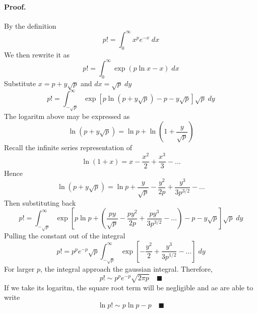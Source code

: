 \documentclass[../../main.tex]{subfiles}
\begin{document}
\paragraph*{Proof.} By the definition
\begin{equation*}
    p!=\int_{0}^{\infty}x^pe^{-x}\;dx
\end{equation*} 
We then rewrite it as 
\begin{equation*}
    p!=\int_{0}^{\infty}\exp\left(p\ln x-x\right)\;dx 
\end{equation*}
Substitute $x=p+y\sqrt{p}$ and $dx=\sqrt{p}\;dy$
\begin{equation*}
    p!=\int_{-\sqrt{p}}^{\infty}\exp\left[p\ln \left(p+y\sqrt{p} \right)-p-y\sqrt{p}\right]\sqrt{p}\;dy 
\end{equation*}
The logaritm above may be expressed as 
\begin{equation*}
    \ln \left(p+y\sqrt{p} \right)=\ln p+\ln \left(1+\frac{y}{\sqrt{p}}\right)
\end{equation*}
Recall the infinite series representation of 
\begin{equation*}
    \ln (1+x)=x-\frac{x^2}{2}+\frac{x^3}{3}-\dots
\end{equation*}
Hence 
\begin{equation*}
    \ln \left(p+y\sqrt{p} \right)=\ln p+\frac{y}{\sqrt{p}}-\frac{y^2}{2p}+\frac{y^3}{3p^{3/2}}-\dots
\end{equation*}
Then substituting back 
\begin{equation*}
    p!=\int_{-\sqrt{p}}^{\infty}\exp\left[p\ln p + \left(\frac{py}{\sqrt{p}}-\frac{py^2}{2p}+\frac{py^3}{3p^{3/2}}-\dots\right)-p-y\sqrt{p}\right]\sqrt{p}\;dy 
\end{equation*}
Pulling the constant out of the integral 
\begin{equation*}
    p!=p^pe^{-p}\sqrt{p}\int_{-\sqrt{p}}^{\infty}\exp\left[-\frac{y^2}{2}+\frac{y^3}{3p^{1/2}}-\dots\right]\;dy 
\end{equation*}
For larger $p$, the integral approach the gaussian integral. Therefore,
\begin{equation*}
    p!\sim p^pe^{-p}\sqrt{2\pi p}\quad \blacksquare
\end{equation*}
If we take its logaritm, the square root term will be negligible and ae are able to write 
\begin{equation*}
    \ln p!\sim p\ln p- p\quad \blacksquare
\end{equation*}
\end{document}
